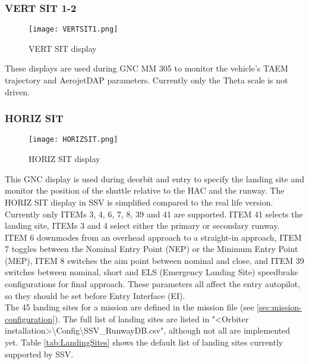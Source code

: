 \documentclass[Space_Shuttle_Vessel_Manual.tex]{subfiles}
\begin{document}
\begin{multicols*}{2}
\subsubsection{VERT SIT 1-2}
\begin{figure}[H]
  \texttt{[image: VERTSIT1.png]}
  \caption{VERT SIT display}
  \label{fig:VERT_SIT}
\end{figure}
These displays are used during GNC MM 305 to monitor the vehicle's TAEM trajectory and AerojetDAP parameters. Currently only the Theta scale is not driven.

\subsubsection{HORIZ SIT}
\begin{figure}[H]
  \texttt{[image: HORIZSIT.png]}
  \caption{HORIZ SIT display}
  \label{fig:HORIZ_SIT}
\end{figure}
This GNC display is used during deorbit and entry to specify the landing site and monitor the position of the shuttle relative to the HAC and the runway.
The HORIZ SIT display in SSV is simplified compared to the real life version.
Currently only ITEMs 3, 4, 6, 7, 8, 39 and 41 are supported.
ITEM 41 selects the landing site, ITEMs 3 and 4 select either the primary or secondary runway. ITEM 6 downmodes from an overhead approach to a straight-in approach, ITEM 7 toggles between the Nominal Entry Point (NEP) or the Minimum Entry Point (MEP), ITEM 8 switches the aim point between nominal and close, and ITEM 39 switches between nominal, short and ELS (Emergency Landing Site) speedbrake configurations for final approach.
These parameters all affect the entry autopilot, so they should be set before Entry Interface (EI).\\
The 45 landing sites for a mission are defined in the mission file (see \ref{sec:mission-configuration}). The full list of landing sites are listed in "<Orbiter installation>\textbackslash Config\textbackslash SSV\_RunwayDB.csv", although not all are implemented yet. Table \ref{tab:LandingSites} shows the default list of landing sites currently supported by SSV.


\end{multicols*}
\end{document}
